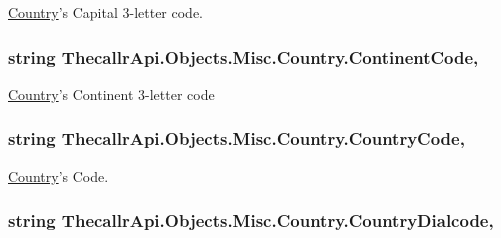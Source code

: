 \hyperlink{class_thecallr_api_1_1_objects_1_1_misc_1_1_country}{Country}'s Capital 3-\/letter code. 

\hypertarget{class_thecallr_api_1_1_objects_1_1_misc_1_1_country_a4c1b15a803f665cc4613caa1d4a23dc4}{
\subsubsection[{Continent\+Code}]{\setlength{\rightskip}{0pt plus 5cm}string Thecallr\+Api.\+Objects.\+Misc.\+Country.\+Continent\+Code\hspace{0.3cm}{\ttfamily [get]}, {\ttfamily [set]}}}\label{class_thecallr_api_1_1_objects_1_1_misc_1_1_country_a4c1b15a803f665cc4613caa1d4a23dc4}


\hyperlink{class_thecallr_api_1_1_objects_1_1_misc_1_1_country}{Country}'s Continent 3-\/letter code 

\hypertarget{class_thecallr_api_1_1_objects_1_1_misc_1_1_country_ad53605ad72d876c812539599fddee9a3}{
\subsubsection[{Country\+Code}]{\setlength{\rightskip}{0pt plus 5cm}string Thecallr\+Api.\+Objects.\+Misc.\+Country.\+Country\+Code\hspace{0.3cm}{\ttfamily [get]}, {\ttfamily [set]}}}\label{class_thecallr_api_1_1_objects_1_1_misc_1_1_country_ad53605ad72d876c812539599fddee9a3}


\hyperlink{class_thecallr_api_1_1_objects_1_1_misc_1_1_country}{Country}'s Code. 

\hypertarget{class_thecallr_api_1_1_objects_1_1_misc_1_1_country_a8589fecc9228607d3eb57a33c0ba350f}{
\subsubsection[{Country\+Dialcode}]{\setlength{\rightskip}{0pt plus 5cm}string Thecallr\+Api.\+Objects.\+Misc.\+Country.\+Country\+Dialcode\hspace{0.3cm}{\ttfamily [get]}, {\ttfamily [set]}}}\label{class_thecallr_api_1_1_objects_1_1_misc_1_1_country_a8589fecc9228607d3eb57a33c0ba350f}


